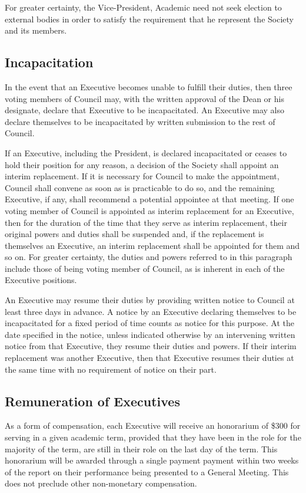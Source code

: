 For greater certainty, the Vice-President, Academic need not seek election to
external bodies in order to satisfy the requirement that he represent the
Society and its members.

\subsection{Incapacitation}
In the event that an Executive becomes unable to fulfill their duties, then
three voting members of Council may, with the written approval of the Dean or
his designate, declare that Executive to be incapacitated. An Executive may also
declare themselves to be incapacitated by written submission to the rest of
Council.

If an Executive, including the President, is declared incapacitated or ceases to
hold their position for any reason, a decision of the Society shall appoint an
interim replacement. If it is necessary for Council to make the appointment,
Council shall convene as soon as is practicable to do so, and the remaining
Executive, if any, shall recommend a potential appointee at that meeting. If one
voting member of Council is appointed as interim replacement for an Executive,
then for the duration of the time that they serve as interim replacement, their
original powers and duties shall be suspended and, if the replacement is
themselves an Executive, an interim replacement shall be appointed for them and
so on. For greater certainty, the duties and powers referred to in this
paragraph include those of being voting member of Council, as is inherent in
each of the Executive positions.

An Executive may resume their duties by providing written notice to Council at
least three days in advance. A notice by an Executive declaring themselves to be
incapacitated for a fixed period of time counts as notice for this purpose. At
the date specified in the notice, unless indicated otherwise by an intervening
written notice from that Executive, they resume their duties and powers. If
their interim replacement was another Executive, then that Executive resumes
their duties at the same time with no requirement of notice on their part.

\subsection{Remuneration of Executives}
As a form of compensation, each Executive will receive an honorarium of \$300 for serving in a given academic term, provided that they have been in the role for the majority of the term, are still in their role on the last day of the term. This honorarium will be awarded through a single payment payment within two weeks of the report on their performance being presented to a General Meeting. This does not preclude other non-monetary compensation. 

